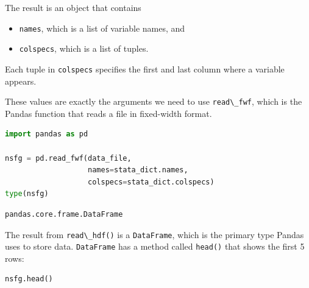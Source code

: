 The result is an object that contains

\begin{itemize}
\item
  \passthrough{\lstinline!names!}, which is a list of variable names,
  and
\item
  \passthrough{\lstinline!colspecs!}, which is a list of tuples.
\end{itemize}

Each tuple in \passthrough{\lstinline!colspecs!} specifies the first and
last column where a variable appears.

These values are exactly the arguments we need to use
\passthrough{\lstinline!read\_fwf!}, which is the Pandas function that
reads a file in fixed-width format.

\begin{lstlisting}[language=Python]
import pandas as pd

nsfg = pd.read_fwf(data_file, 
                   names=stata_dict.names, 
                   colspecs=stata_dict.colspecs)
type(nsfg)
\end{lstlisting}

\begin{lstlisting}[]
pandas.core.frame.DataFrame
\end{lstlisting}

The result from \passthrough{\lstinline!read\_hdf()!} is a
\passthrough{\lstinline!DataFrame!}, which is the primary type Pandas
uses to store data. \passthrough{\lstinline!DataFrame!} has a method
called \passthrough{\lstinline!head()!} that shows the first 5 rows:

\begin{lstlisting}[language=Python]
nsfg.head()
\end{lstlisting}

